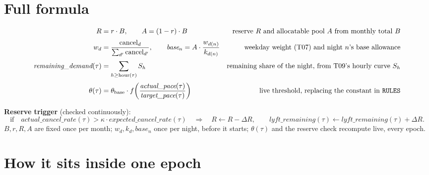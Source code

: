 \documentclass[11pt]{article}
\begin{document}
\section{Full formula}
\label{sec:formula}

\begin{align}
R &= r \cdot B, \qquad A = (1-r)\cdot B
  & \text{reserve } R \text{ and allocatable pool } A \text{ from monthly total } B \notag\\[2pt]
w_d &= \frac{\text{cancel}_d}{\sum_{d'} \text{cancel}_{d'}}, \qquad
  \textit{base}_n = A \cdot \frac{w_{d(n)}}{k_{d(n)}}
  & \text{weekday weight (T07) and night } n\text{'s base allowance} \notag\\[2pt]
\textit{remaining\_demand}(\tau) &= \sum_{h \ge \text{hour}(\tau)} S_h
  & \text{remaining share of the night, from T09's hourly curve } S_h \notag\\[2pt]
\theta(\tau) &= \theta_{\text{base}} \cdot f\!\left(\frac{\textit{actual\_pace}(\tau)}{\textit{target\_pace}(\tau)}\right)
  & \text{live threshold, replacing the constant in \texttt{RULES}} \notag
\end{align}

\textbf{Reserve trigger} (checked continuously):
\[
  \text{if}\quad \textit{actual\_cancel\_rate}(\tau) > \kappa \cdot \textit{expected\_cancel\_rate}(\tau)
  \quad\Rightarrow\quad R \leftarrow R - \Delta R, \qquad \textit{lyft\_remaining}(\tau) \leftarrow
  \textit{lyft\_remaining}(\tau) + \Delta R.
\]
$B,r,R,A$ are fixed once per month; $w_d, k_d, \textit{base}_n$ once per night, before it starts; $\theta(\tau)$
and the reserve check recompute live, every epoch.

\section{How it sits inside one epoch}
\label{sec:flow}
\end{document}
